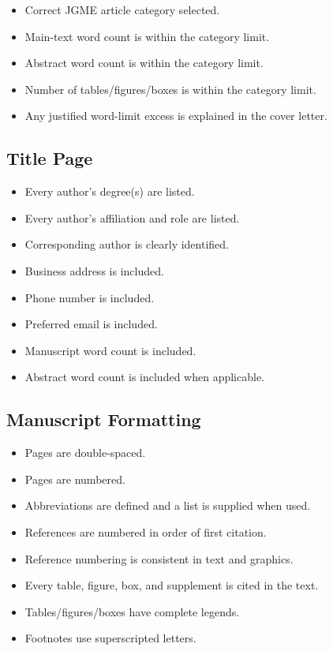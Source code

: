 \documentclass[12pt]{article}
\begin{document}
\begin{itemize}[label=$\square$, leftmargin=*]
	\item Correct JGME article category selected.
	\item Main-text word count is within the category limit.
	\item Abstract word count is within the category limit.
	\item Number of tables/figures/boxes is within the category limit.
	\item Any justified word-limit excess is explained in the cover letter.
\end{itemize}

\subsection*{Title Page}

\begin{itemize}[label=$\square$, leftmargin=*]
	\item Every author's degree(s) are listed.
	\item Every author's affiliation and role are listed.
	\item Corresponding author is clearly identified.
	\item Business address is included.
	\item Phone number is included.
	\item Preferred email is included.
	\item Manuscript word count is included.
	\item Abstract word count is included when applicable.
\end{itemize}

\subsection*{Manuscript Formatting}

\begin{itemize}[label=$\square$, leftmargin=*]
	\item Pages are double-spaced.
	\item Pages are numbered.
	\item Abbreviations are defined and a list is supplied when used.
	\item References are numbered in order of first citation.
	\item Reference numbering is consistent in text and graphics.
	\item Every table, figure, box, and supplement is cited in the text.
	\item Tables/figures/boxes have complete legends.
	\item Footnotes use superscripted letters.
\end{itemize}
\end{document}
